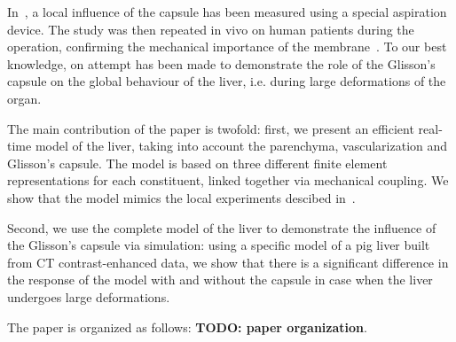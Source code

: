 \documentclass{llncs}
\newcommand{\TODO}[1]{{\color{red}\textbf{TODO: #1}}}
\begin{document}
In~\cite{Hollenstein2006}, a local influence of the capsule has been measured using a special aspiration device. The study was then repeated 
in vivo on human patients during the operation, confirming the mechanical importance of the membrane~\cite{Ahn2010,Nava2008}.
To our best knowledge, on attempt has been made to demonstrate the role of the Glisson's capsule on the global behaviour of 
the liver, i.e. during large deformations of the organ.

The main contribution of the paper is twofold: first, we present an efficient real-time model of the liver, taking into account 
the parenchyma, vascularization and Glisson's capsule. The model is based on three different finite element representations for each constituent,
linked together via mechanical coupling. We show that the model mimics the local experiments descibed in~\cite{Hollenstein2006}.
 
Second, we use the complete model of the liver to demonstrate the influence of the Glisson's
capsule via simulation: using a specific model of a pig liver built from CT contrast-enhanced data, we show that there is a significant 
difference in the response of the model with and without the capsule in case when the liver undergoes large deformations. 

The paper is organized as follows: \TODO{paper organization}.
\end{document}
